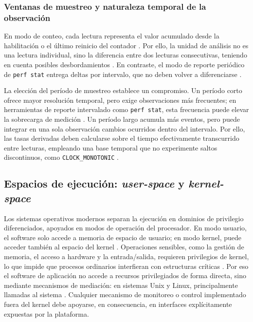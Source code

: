 \documentclass[12pt,oneside,spanish]{book}
\begin{document}
\subsubsection{Ventanas de muestreo y naturaleza temporal de la observación}
\label{sec:ventanas}

En modo de conteo, cada lectura representa el valor acumulado desde la
habilitación o el último reinicio del contador
\cite{LinuxPerfEventOpen2026}. Por ello, la unidad de análisis no es una lectura
individual, sino la diferencia entre dos lecturas consecutivas, teniendo en
cuenta posibles desbordamientos \cite{IntelSDM2026}. En contraste, el modo de
reporte periódico de \texttt{perf stat} entrega deltas por intervalo, que no
deben volver a diferenciarse \cite{LinuxPerfStat2026}.

La elección del período de muestreo establece un compromiso. Un período corto
ofrece mayor resolución temporal, pero exige observaciones más frecuentes; en
herramientas de reporte intervalado como \texttt{perf stat}, esta frecuencia
puede elevar la sobrecarga de medición \cite{LinuxPerfStat2026}. Un período
largo acumula más eventos, pero puede integrar en una sola observación cambios
ocurridos dentro del intervalo. Por ello, las tasas derivadas deben calcularse
sobre el tiempo efectivamente transcurrido entre lecturas, empleando una base
temporal que no experimente saltos discontinuos, como
\texttt{CLOCK\_MONOTONIC} \cite{LinuxClockGettime2026}.

\subsection{Espacios de ejecución: \textit{user-space} y \textit{kernel-space}}

Los sistemas operativos modernos separan la ejecución en dominios de privilegio diferenciados, apoyados en modos de operación del procesador. En modo usuario, el software solo accede a memoria de espacio de usuario; en modo kernel, puede acceder también al espacio del kernel \cite[ch.~2]{Kerrisk2010}. Operaciones sensibles, como la gestión de memoria, el acceso a hardware y la entrada/salida, requieren privilegios de kernel, lo que impide que procesos ordinarios interfieran con estructuras críticas \cite[ch.~2]{Kerrisk2010}. Por eso el software de aplicación no accede a recursos privilegiados de forma directa, sino mediante mecanismos de mediación: en sistemas Unix y Linux, principalmente llamadas al sistema \cite{McCarty2015}. Cualquier mecanismo de monitoreo o control implementado fuera del kernel debe apoyarse, en consecuencia, en interfaces explícitamente expuestas por la plataforma.
\end{document}
